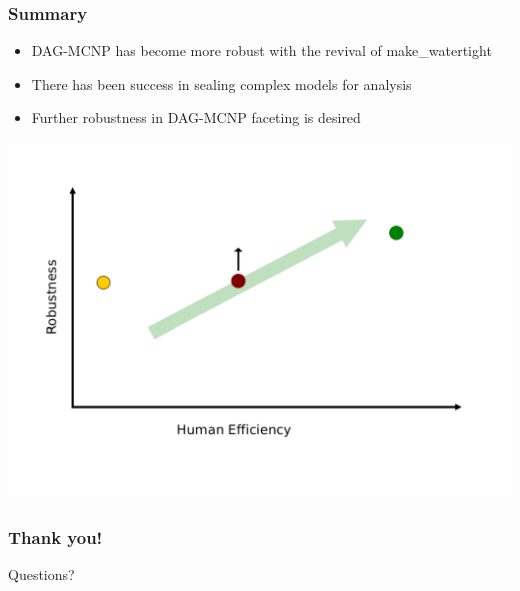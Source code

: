 \documentclass[14pt]{beamer}
\begin{document}
\begin{frame}
\frametitle{Summary}
\begin{itemize}
\item DAG-MCNP has become more robust with the revival of make\_watertight

\item There has been success in sealing complex models for analysis

\item Further robustness in DAG-MCNP faceting is desired
\end{itemize}
\begin{center}
\includegraphics[scale=0.2]{InitialGraphImpact_postmw.png}
\end{center}

\end{frame}


\begin{frame}
\frametitle{Thank you!}

\begin{center}
Questions?
\end{center}

\end{frame}
\end{document}
